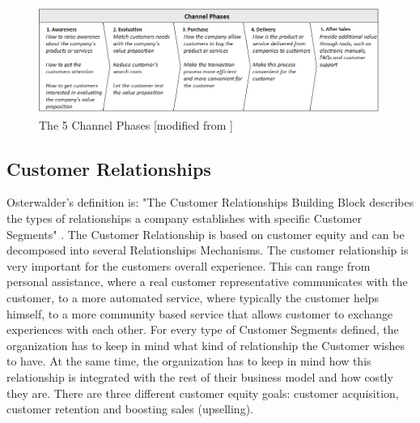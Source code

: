 \begin{figure}[h]
\caption[ChannelPhases]{The 5 Channel Phases [modified from \cite{osterwalder} \cite{osterwalderthesis}]}
\label{fig:ChannelPhases}
\begin{center}
\includegraphics[scale=0.6]{kjopskjede}
\end{center}
\end{figure} 

\newpage
\subsection{Customer Relationships}
Osterwalder's definition is: "The Customer Relationships Building Block describes the types of relationships a company establishes with specific Customer Segments" \cite{osterwalder}. The Customer Relationship is based on customer equity and can be decomposed into several Relationships Mechanisms. The customer relationship is very important for the customers overall experience. This can range from personal assistance, where a real customer representative communicates with the customer, to a more automated service, where typically the customer helps himself,  to a more community based service that allows customer to exchange experiences with each other. For every type of Customer Segments defined, the organization has to keep in mind what kind of relationship the Customer wishes to have. At the same time, the organization has to keep in mind how this relationship is integrated with the rest of their business model and how costly they are. There are three different customer equity goals: customer acquisition, customer retention and boosting sales (upselling).

